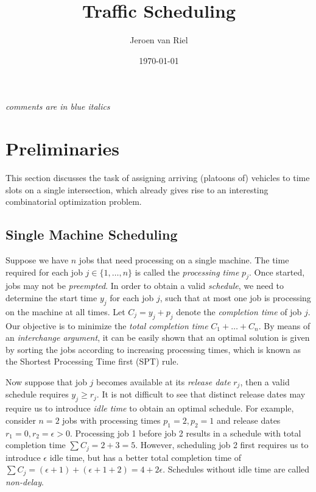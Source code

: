 \documentclass{article}
\title{Traffic Scheduling}
\author{Jeroen van Riel}
\date{\monthyeardate\today}
\theoremstyle{definition}
\theoremstyle{plain}
\begin{document}
\maketitle

\noindent
\textit{\color{blue}comments are in blue italics}

\section{Preliminaries}

This section discusses the task of assigning arriving (platoons of) vehicles to
time slots on a single intersection, which already gives rise to an interesting
combinatorial optimization problem.

\subsection{Single Machine Scheduling}

Suppose we have $n$ jobs that need processing on a single machine. The time
required for each job $j \in \{1, \dots, n\}$ is called the \textit{processing
  time} $p_{j}$. Once started, jobs may not be \textit{preempted}. In order to
obtain a valid \textit{schedule}, we need to determine the start time $y_{j}$
for each job $j$, such that at most one job is processing on the machine at all
times. Let $C_{j} = y_{j} + p_{j}$ denote the \textit{completion time} of job
$j$. Our objective is to minimize the \textit{total completion time}
$C_{1} + \dots + C_{n}$. By means of an \textit{interchange argument}, it can be
easily shown that an optimal solution is given by sorting the jobs according to
increasing processing times, which is known as the Shortest Processing Time
first (SPT) rule.

Now suppose that job $j$ becomes available at its \textit{release date} $r_{j}$,
then a valid schedule requires $y_{j} \geq r_{j}$. It is not difficult to see
that distinct release dates may require us to introduce \textit{idle time} to
obtain an optimal schedule. For example, consider $n=2$ jobs with processing
times $p_{1}=2, p_{2}=1$ and release dates $r_{1}=0, r_{2}=\epsilon > 0$.
Processing job 1 before job 2 results in a schedule with total completion time
$\sum C_{j} = 2 + 3 = 5$. However, scheduling job 2 first requires us to
introduce $\epsilon$ idle time, but has a better total completion time of
$\sum C_{j} = (\epsilon + 1) + (\epsilon + 1 + 2) = 4 + 2 \epsilon$. Schedules
without idle time are called \textit{non-delay}.
\end{document}
